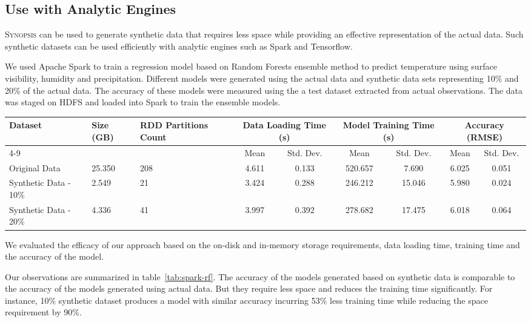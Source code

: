 \subsection{Use with Analytic Engines}
\textsc{Synopsis} can be used to generate synthetic data that requires less space while providing an effective representation of the actual data.
Such synthetic datasets can be used efficiently with analytic engines such as Spark and Tensorflow.

We used Apache Spark to train a regression model based on Random Forests ensemble method to predict temperature using surface visibility, humidity and precipitation.
Different models were generated using the actual data and synthetic data sets representing 10\% and 20\% of the actual data.
The accuracy of these models were measured using the a test dataset extracted from actual observations.
The data was staged on HDFS and loaded into Spark to train the ensemble models.
%
\begin{table*}
    \renewcommand{\arraystretch}{1.3}
    \caption{Comparing Random Forest based regression models generated by Spark MLlib using synthetic vs. real data}
    \label{tab:spark-rf}
    \begin{center}
        \begin{tabularx}{0.98\textwidth}{|X|X|X|c|c|c|c|c|c|}
            \hline
            \multirow{2}{*}{Dataset} & \multirow{2}{*}{Size (GB)} & \multirow{2}{*}{RDD Partitions Count} & \multicolumn{2}{c|}{\cellcolor[gray]{0.7}Data Loading Time (s)} &\multicolumn{2}{c|}{\cellcolor[gray]{0.7}Model Training Time (s)} & \multicolumn{2}{c|}{\cellcolor[gray]{0.7}Accuracy (RMSE)}\\
            \cline{4-9}
             & & & \cellcolor[gray]{0.9}Mean & \cellcolor[gray]{0.9}Std. Dev.  &  \cellcolor[gray]{0.9}Mean & \cellcolor[gray]{0.9}Std. Dev. &  \cellcolor[gray]{0.9}Mean & \cellcolor[gray]{0.9}Std. Dev. \\
            \hline
            Original Data & 25.350 & 208 & 4.611 & 0.133 & 520.657 & 7.690 & 6.025 & 0.051 \\
            \hline
            Synthetic Data - 10\% & 2.549 & 21 & 3.424 & 0.288 & 246.212 & 15.046 & 5.980 & 0.024 \\
            \hline
            Synthetic Data - 20\% & 4.336 & 41 & 3.997 & 0.392 & 278.682 & 17.475 & 6.018 & 0.064 \\
            \hline
		\end{tabularx}
	\end{center}
\end{table*}
%
We evaluated the efficacy of our approach based on the on-disk and in-memory storage requirements, data loading time, training time and the accuracy of the model.

Our observations are summarized in table~\ref{tab:spark-rf}.
The accuracy of the models generated based on synthetic data is comparable to the accuracy of the models generated using actual data.
But they require less space and reduces the training time significantly.
For instance, 10\% synthetic dataset produces a model with similar accuracy incurring 53\% less training time while reducing the space requirement by 90\%. 